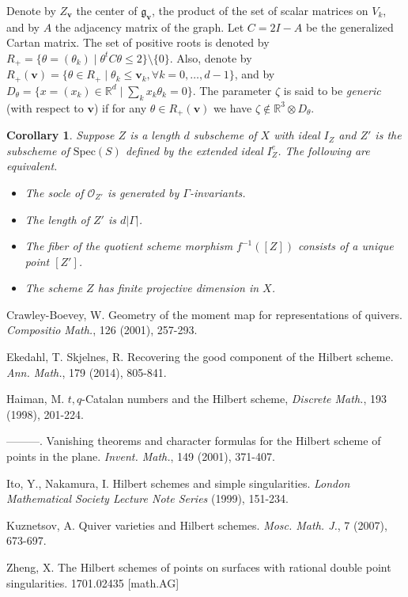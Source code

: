 \documentclass{amsart}[12pt]
\newtheorem{cor}[theorem]{Corollary}
\theoremstyle{definition}
\theoremstyle{remark}
\numberwithin{equation}{section}
\begin{document}
Denote by $Z_{\mathbf{v}}$ the center of $\mathfrak{g}_{\mathbf{v}}$, the product of the set of scalar matrices on $V_k$, and by $A$ the adjacency matrix of the graph. Let $C = 2I - A$ be the generalized Cartan matrix. The set of positive roots is denoted by $R_+ = \{\theta = (\theta_k) \mid \theta^t C \theta \leq 2\} \setminus \{0\}$. Also, denote by $R_+(\mathbf{v}) = \{\theta \in R_+ \mid \theta_k \leq \mathbf{v}_k, \forall k = 0, \dots, d - 1\}$, and by $D_\theta = \{x = (x_k) \in \mathbb{R}^d \mid \sum_k x_k \theta_k = 0\}$. The parameter $\zeta$ is said to be \textit{generic} (with respect to $\mathbf{v}$) if for any $\theta \in R_+(\mathbf{v})$ we have $\zeta \notin \mathbb{R}^3 \otimes D_\theta$.








\begin{cor}
Suppose $Z$ is a length $d$ subscheme of $X$ with ideal $I_Z$ and $Z'$ is the subscheme of $\mathrm{Spec}(S)$ defined by the extended ideal $I_Z^e$. The following are equivalent.
\begin{itemize}
\item[1.] The socle of $\mathcal{O}_{Z'}$ is generated by $\Gamma$-invariants.
\item[2.] The length of $Z'$ is $d \vert \Gamma \vert$.
\item[3.] The fiber of the quotient scheme morphism $f^{-1}([Z])$ consists of a unique point $[Z']$.
\item[4.] The scheme $Z$ has finite projective dimension in $X$. 
\end{itemize}
\end{cor}



\begin{thebibliography}{00}

Crawley-Boevey, W. Geometry of the moment map for representations of quivers. \textit{Compositio Math.}, 126 (2001), 257-293.

Ekedahl, T. Skjelnes, R. Recovering the good component of the Hilbert scheme. \textit{Ann. Math.}, 179 (2014), 805-841.

Haiman, M. $t, q$-Catalan numbers and the Hilbert scheme, \textit{Discrete Math.}, 193 (1998), 201-224.

---------. Vanishing theorems and character formulas for the Hilbert scheme of points in the plane. \textit{Invent. Math.}, 149 (2001), 371-407.

Ito, Y., Nakamura, I. Hilbert schemes and simple singularities. \textit{London Mathematical Society Lecture Note Series} (1999), 151-234.

Kuznetsov, A. Quiver varieties and Hilbert schemes. \textit{Mosc. Math. J.}, 7 (2007), 673-697.

Zheng, X. The Hilbert schemes of points on surfaces with rational double point singularities. 1701.02435 [math.AG]


\end{thebibliography}
\end{document}
